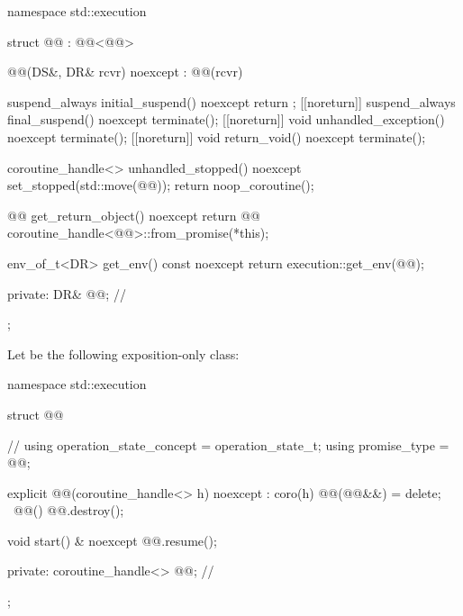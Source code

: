 \begin{codeblock}
namespace std::execution {
  struct @@ : @@<@@> {

    @@(DS&, DR& rcvr) noexcept : @@(rcvr) {}

    suspend_always initial_suspend() noexcept { return {}; }
    [[noreturn]] suspend_always final_suspend() noexcept { terminate(); }
    [[noreturn]] void unhandled_exception() noexcept { terminate(); }
    [[noreturn]] void return_void() noexcept { terminate(); }

    coroutine_handle<> unhandled_stopped() noexcept {
      set_stopped(std::move(@@));
      return noop_coroutine();
    }

    @@ get_return_object() noexcept {
      return @@{
        coroutine_handle<@@>::from_promise(*this)};
    }

    env_of_t<DR> get_env() const noexcept {
      return execution::get_env(@@);
    }

  private:
    DR& @@;                           // \expos
  };
}
\end{codeblock}

\pnum
Let  be the following exposition-only class:
\begin{codeblock}
namespace std::execution {
  struct @@ {                              // \expos
    using operation_state_concept = operation_state_t;
    using promise_type = @@;

    explicit @@(coroutine_handle<> h) noexcept : coro(h) {}
    @@(@@&&) = delete;
    ~@@() { @@.destroy(); }

    void start() & noexcept {
      @@.resume();
    }

  private:
    coroutine_handle<> @@;                                    // \expos
  };
}
\end{codeblock}

